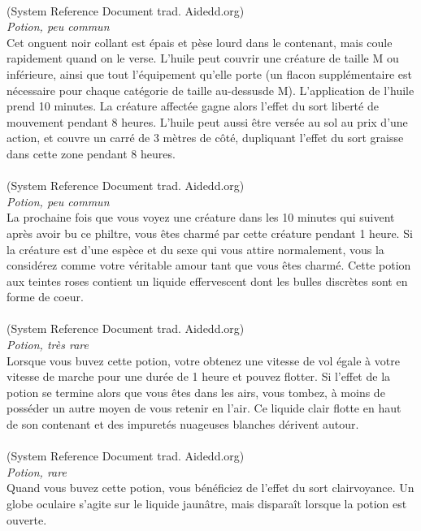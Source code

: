 \\
{\small (System Reference Document trad. Aidedd.org)}\\
{\small \it Potion, peu commun}\\
Cet onguent noir collant est épais et pèse lourd dans le contenant, mais coule rapidement quand on le verse. L'huile peut couvrir une créature de taille M ou inférieure, ainsi que tout l'équipement qu'elle porte (un flacon supplémentaire est nécessaire pour chaque catégorie de taille au-dessusde M). L'application de l'huile prend 10 minutes. La créature affectée gagne alors l'effet du sort liberté de mouvement pendant 8 heures.
L'huile peut aussi être versée au sol au prix d'une action, et couvre un carré de 3 mètres de côté, dupliquant l'effet du sort graisse dans cette zone pendant 8 heures. \\

\\
{\small (System Reference Document trad. Aidedd.org)}\\
{\small \it Potion, peu commun}\\
La prochaine fois que vous voyez une créature dans les 10 minutes qui suivent après avoir bu ce philtre, vous êtes charmé par cette créature pendant 1 heure. Si la créature est d'une espèce et du sexe qui vous attire normalement, vous la considérez comme votre véritable amour tant que vous êtes charmé. Cette potion aux teintes roses contient un liquide effervescent dont les bulles discrètes sont en forme de coeur. \\

\\
{\small (System Reference Document trad. Aidedd.org)}\\
{\small \it Potion, très rare}\\
Lorsque vous buvez cette potion, votre obtenez une vitesse de vol égale à votre vitesse de marche pour une durée de 1 heure et pouvez flotter. Si l'effet de la potion se termine alors que vous êtes dans les airs, vous tombez, à moins de posséder un autre moyen de vous retenir en l'air. Ce liquide clair flotte en haut de son contenant et des impuretés nuageuses blanches dérivent autour. \\

\\
{\small (System Reference Document trad. Aidedd.org)}\\
{\small \it Potion, rare}\\
Quand vous buvez cette potion, vous bénéficiez de l'effet du sort clairvoyance. Un globe oculaire s'agite sur le liquide jaunâtre, mais disparaît lorsque la potion est ouverte. \\
\pagebreak

